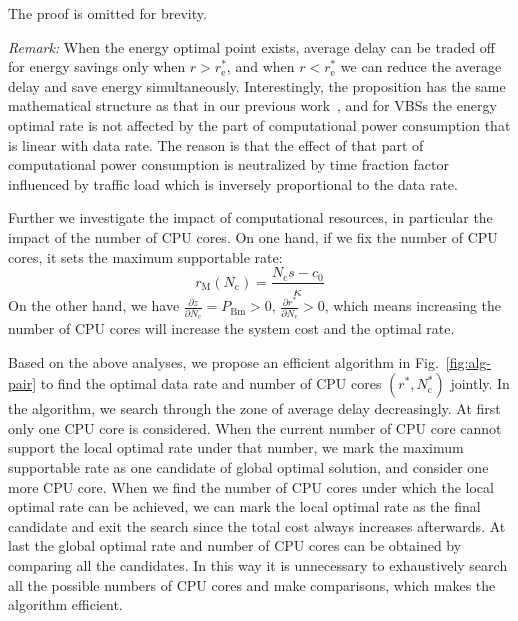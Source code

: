 \documentclass[conference]{IEEEtran}
\begin{document}
The proof is omitted for brevity.

\emph{Remark:}
When the energy optimal point exists, average delay can be traded off
for energy savings only when $r > r_\text{e}^*$, and when $r < r_\text{e}^*$
we can reduce the average delay and save energy simultaneously.
Interestingly, the proposition has the same mathematical structure as that in
our previous work~\cite{wu2013traffic}, and for VBSs
the energy optimal rate is not affected by the part of computational power
consumption that is linear with data rate. The reason is that the effect of
that part of
computational power consumption is neutralized by time fraction factor
influenced by traffic load which is inversely proportional to the data rate.

Further we investigate the impact of computational resources, in particular
the impact of the number of CPU cores.
On one hand, if we fix the number of CPU cores, it sets the maximum supportable
rate:
\begin{equation}
  r_\text{M}(N_\text{c}) = \frac{N_\text{c} s - c_0}{\kappa}
  \label{eqn:rM}
\end{equation}
On the other hand, we have
$ \frac{\partial z}{\partial N_\text{c}} = P_\text{Bm} > 0 $,
$ \frac{\partial r^*}{\partial N_\text{c}} > 0 $,
which means increasing the number of CPU cores
will increase the system cost and the optimal rate.

Based on the above analyses, we propose an efficient algorithm in
Fig.~\ref{fig:alg-pair} to find the optimal data rate and
number of CPU cores $(r^*, N_\text{c}^*)$ jointly.
In the algorithm, we search through the zone of average delay decreasingly.
At first only one CPU core is considered.
When the current number of CPU core cannot support the local optimal rate under
that number, we mark the maximum supportable rate as one candidate of
global optimal solution, and consider one more CPU core.
When we find the number of CPU cores under which the local optimal rate
can be achieved,
we can mark the local optimal rate as the final candidate and exit the search
since the total cost always increases afterwards.
At last the global optimal rate and number of CPU cores
can be obtained by comparing all the candidates.
In this way it is unnecessary to exhaustively search all the possible numbers of CPU cores and make comparisons, which makes the algorithm efficient.
\end{document}
